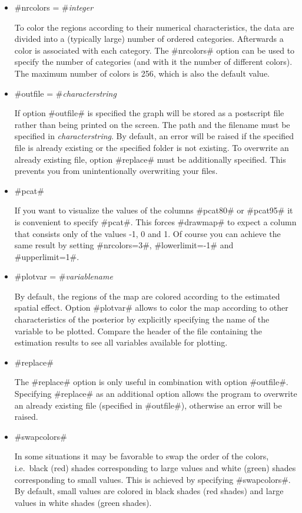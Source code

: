 \begin{itemize}
\item #nrcolors = #{\em integer}

To color the regions according to their numerical characteristics,
the data are divided into a (typically large) number of ordered
categories. Afterwards a color is associated with each category. The
#nrcolors# option can be used to specify the number of categories
(and with it the number of different colors). The maximum number of
colors is 256, which is also the default value.

\item #outfile = #{\em characterstring}

If option #outfile# is specified the graph will be stored as a
postscript file rather than being printed on the screen. The path
and the filename must be specified in {\em characterstring}. By
default, an error will be raised if the specified file is already
existing or the specified folder is not existing. To overwrite an
already existing file, option #replace# must be additionally
specified. This prevents you from unintentionally overwriting your
files.

\item #pcat#

If you want to visualize the values of the columns #pcat80# or
#pcat95# it is convenient to specify #pcat#. This forces #drawmap#
to expect a column that consists only of the values -1, 0 and 1. Of
course you can achieve the same result by setting #nrcolors=3#,
#lowerlimit=-1# and #upperlimit=1#.

\item #plotvar = #{\em variablename}

By default, the regions of the map are colored according to the
estimated spatial effect. Option #plotvar# allows to color the map
according to other characteristics of the posterior by explicitly
specifying the name of the variable to be plotted. Compare the
header of the file containing the estimation results to see all
variables available for plotting.

\item #replace#

The #replace# option is only useful in combination with option
#outfile#. Specifying #replace# as an additional option allows the
program to overwrite an already existing file (specified in
#outfile#), otherwise an error will be raised.

\item #swapcolors#

In some situations it may be favorable to swap the order of the
colors, i.e.~black (red) shades corresponding to large values and
white (green) shades corresponding to small values. This is
achieved by specifying #swapcolors#. By default, small values are
colored in black shades (red shades) and large values in white
shades (green shades).


\end{itemize}

